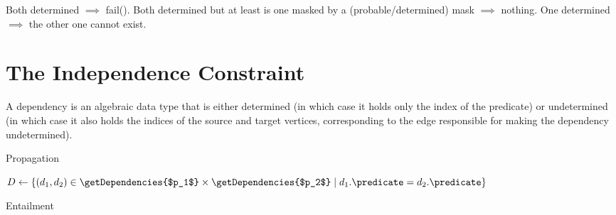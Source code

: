 \documentclass{article}
\begin{document}
Both determined $\implies$ fail(). Both determined but at least is one masked by
a (probable/determined) mask $\implies$ nothing. One determined $\implies$ the
other one cannot exist.

\section{The Independence Constraint}

A dependency is an algebraic data type that is either determined (in which case
it holds only the index of the predicate) or undetermined (in which case it also
holds the indices of the source and target vertices, corresponding to the edge
responsible for making the dependency undetermined).

\begin{algorithm}
  \caption{Propagation}
\end{algorithm}

\begin{algorithm}
  $D \gets \{ (d_1, d_2) \in \getDependencies{$p_1$} \times
  \getDependencies{$p_2$} \mid d_1.\predicate = d_2.\predicate \}$\;
  \;
  \caption{Entailment}
\end{algorithm}
\end{document}
